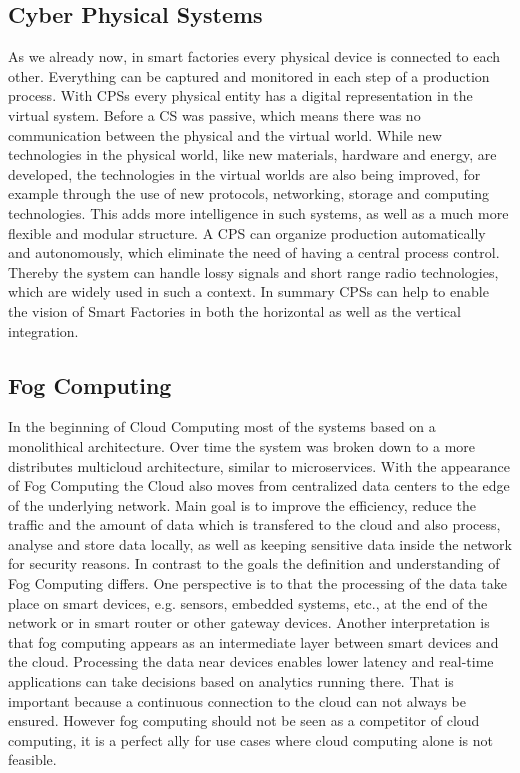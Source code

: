 \subsection{Cyber Physical Systems}
As we already now, in smart factories every physical device is connected to each other.
Everything can be captured and monitored in each step of a production process.
With \acp{CPS} every physical entity has a digital representation in the virtual system.\cite[cf.][p. 1363]{Poovendran:2010}
Before a \ac{CS} was passive, which means there was no communication between the physical and the virtual world.\cite[cf.][p. 1364]{Poovendran:2010}
While new technologies in the physical world, like new materials, hardware and energy, are developed, the technologies in the virtual worlds are also being improved, for example through the use of new protocols, networking, storage and computing technologies.\cite[cf.][p. 1364]{Poovendran:2010}
This adds more intelligence in such systems, as well as a much more flexible and modular structure.
A \ac{CPS} can organize production automatically and autonomously, which eliminate the need of having a central process control.\cite[cf.]{Lom:2016}
Thereby the system can handle lossy signals and short range radio technologies, which are widely used in such a context.\cite[cf.]{Yannuzzi2014}
In summary \acp{CPS} can help to enable the vision of Smart Factories in both the horizontal as well as the vertical integration.


\subsection{Fog Computing}
In the beginning of Cloud Computing most of the systems based on a monolithical architecture.
Over time the system was broken down to a more distributes multicloud architecture, similar to microservices.
With the appearance of Fog Computing the Cloud also moves from centralized data centers to the edge of the underlying network.
Main goal is to improve the efficiency, reduce the traffic and the amount of data which is transfered to the cloud and also process, analyse and store data locally, as well as keeping sensitive data inside the network for security reasons.\cite[cf.][p. 236]{Brito2016}\cite[cf.][p. 325]{Yannuzzi2014}\cite[cf.][p. 4]{Lom:2016}
In contrast to the goals the definition and understanding of Fog Computing differs.
One perspective is to that the processing of the data take place on smart devices, e.g. sensors, embedded systems, etc., at the end of the network or in smart router or other gateway devices.\cite[cf.][p. 4]{Lom:2016}
Another interpretation is that fog computing appears as an intermediate layer between smart devices and the cloud.\cite[cf.][p. 236]{Brito2016}
Processing the data near devices enables lower latency and real-time applications can take decisions based on analytics running there.
That is important because a continuous connection to the cloud can not always be ensured.
However fog computing should not be seen as a competitor of cloud computing, it is a perfect ally for use cases where cloud computing alone is not feasible.\cite[cf.][p. 325]{Yannuzzi2014}


